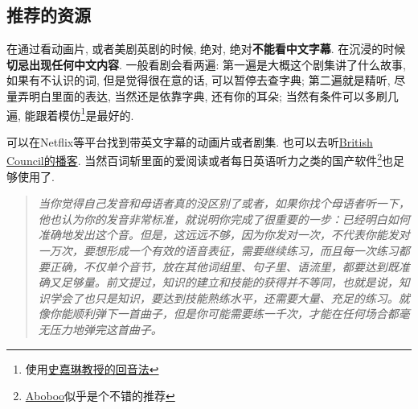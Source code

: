 \documentclass[a4paper]{article}
\begin{document}
\subsection{推荐的资源}
在通过看动画片, 或者美剧英剧的时候, 绝对, 绝对\textbf{不能看中文字幕}. 在沉浸的时候\textbf{切忌出现任何中文内容}. 一般看剧会看两遍: 第一遍是大概这个剧集讲了什么故事, 如果有不认识的词, 但是觉得很在意的话, 可以暂停去查字典; 第二遍就是精听, 尽量弄明白里面的表达, 当然还是依靠字典, 还有你的耳朵; 当然有条件可以多刷几遍, 能跟着模仿\footnote{使用\href{https://www.bilibili.com/video/BV1bt411W7wF?from=search&seid=7195295628981255603}{史嘉琳教授的回音法}}是最好的. 
\par 可以在Netflix等平台找到带英文字幕的动画片或者剧集. 也可以去听\href{https://learnenglish.britishcouncil.org/general-english/podcasts}{British Council的播客}. 当然百词斩里面的爱阅读或者每日英语听力之类的国产软件\footnote{\href{http://www.aboboo.com/}{Aboboo}似乎是个不错的推荐}也足够使用了. 
\begin{quote}
  \textit{当你觉得自己发音和母语者真的没区别了或者，如果你找个母语者听一下，他也认为你的发音非常标准，就说明你完成了很重要的一步：已经明白如何准确地发出这个音。但是，这远远不够，因为你发对一次，不代表你能发对一万次，要想形成一个有效的语音表征，需要继续练习，而且每一次练习都要正确，不仅单个音节，放在其他词组里、句子里、语流里，都要达到既准确又足够量。前文提过，知识的建立和技能的获得并不等同，也就是说，知识学会了也只是知识，要达到技能熟练水平，还需要大量、充足的练习。就像你能顺利弹下一首曲子，但是你可能需要练一千次，才能在任何场合都毫无压力地弹完这首曲子。}
\end{quote}
\end{document}
